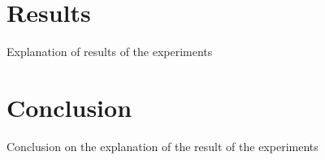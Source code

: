 \documentclass{ba-kecs}
\begin{document}
\section{Results}
Explanation of results of the experiments
\section{Conclusion}
Conclusion on the explanation of the result of the experiments

\end{document}

